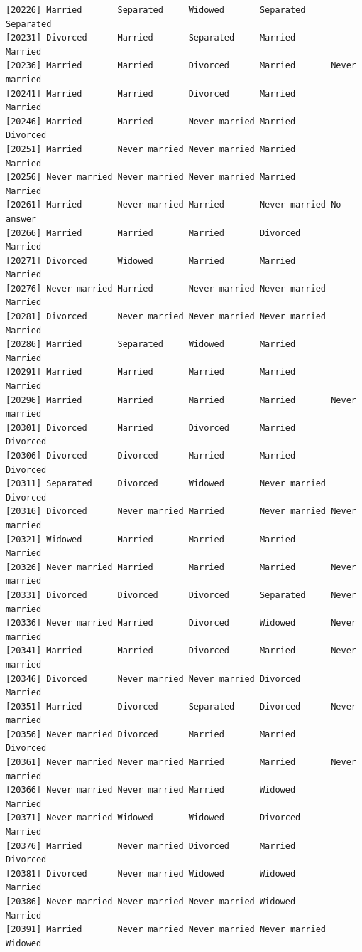 \documentclass[
  letterpaper,
  DIV=11,
  numbers=noendperiod,
  oneside]{scrartcl}
\begin{document}
\begin{verbatim}
[20226] Married       Separated     Widowed       Separated     Separated    
[20231] Divorced      Married       Separated     Married       Married      
[20236] Married       Married       Divorced      Married       Never married
[20241] Married       Married       Divorced      Married       Married      
[20246] Married       Married       Never married Married       Divorced     
[20251] Married       Never married Never married Married       Married      
[20256] Never married Never married Never married Married       Married      
[20261] Married       Never married Married       Never married No answer    
[20266] Married       Married       Married       Divorced      Married      
[20271] Divorced      Widowed       Married       Married       Married      
[20276] Never married Married       Never married Never married Married      
[20281] Divorced      Never married Never married Never married Married      
[20286] Married       Separated     Widowed       Married       Married      
[20291] Married       Married       Married       Married       Married      
[20296] Married       Married       Married       Married       Never married
[20301] Divorced      Married       Divorced      Married       Divorced     
[20306] Divorced      Divorced      Married       Married       Divorced     
[20311] Separated     Divorced      Widowed       Never married Divorced     
[20316] Divorced      Never married Married       Never married Never married
[20321] Widowed       Married       Married       Married       Married      
[20326] Never married Married       Married       Married       Never married
[20331] Divorced      Divorced      Divorced      Separated     Never married
[20336] Never married Married       Divorced      Widowed       Never married
[20341] Married       Married       Divorced      Married       Never married
[20346] Divorced      Never married Never married Divorced      Married      
[20351] Married       Divorced      Separated     Divorced      Never married
[20356] Never married Divorced      Married       Married       Divorced     
[20361] Never married Never married Married       Married       Never married
[20366] Never married Never married Married       Widowed       Married      
[20371] Never married Widowed       Widowed       Divorced      Married      
[20376] Married       Never married Divorced      Married       Divorced     
[20381] Divorced      Never married Widowed       Widowed       Married      
[20386] Never married Never married Never married Widowed       Married      
[20391] Married       Never married Never married Never married Widowed      

\end{verbatim}
\end{document}
